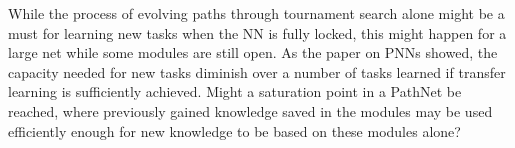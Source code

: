 While the process of evolving paths through tournament search alone might be a must for learning new tasks when the NN is fully locked, this might happen for a large net while some modules are still open. As the paper on PNNs showed, the capacity needed for new tasks diminish over a number of tasks learned if transfer learning is sufficiently achieved. Might a saturation point in a PathNet be reached, where previously gained knowledge saved in the modules may be used efficiently enough for new knowledge to be based on these modules alone? 

